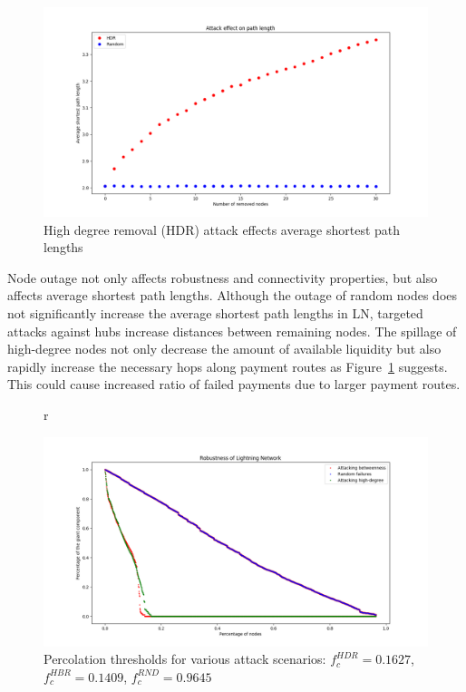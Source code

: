 \documentclass[a4paper]{article}
\theoremstyle{definition}
\begin{document}
\begin{figure}
	\captionsetup{justification=centering,margin=0.1cm}
	\caption{High degree removal (HDR) attack effects average shortest path lengths}\label{fig:attackeffectpath}
	\begin{center}
		\includegraphics[width=\linewidth]{attackEffectPathLength.png}	
	\end{center}
\end{figure}

Node outage not only affects robustness and connectivity properties, but also affects average shortest path lengths. Although the outage of random nodes does not significantly increase the average shortest path lengths in LN, targeted attacks against hubs increase distances between remaining nodes. The spillage of high-degree nodes not only decrease the amount of available liquidity but also rapidly increase the necessary hops along payment routes as Figure~\ref{fig:attackeffectpath} suggests. This could cause increased ratio of failed payments due to larger payment routes. 

\begin{figure}{r}
	\captionsetup{justification=centering,margin=0.5cm}
	\begin{center}
		\includegraphics[width=\linewidth]{randomHighBetweenness.png}	
	\end{center}	
	\caption{Percolation thresholds for various attack scenarios: $f_{c}^{HDR}=0.1627$, $f_{c}^{HBR}=0.1409$, $f_{c}^{RND}=0.9645$}\label{fig:randhighbetween}
	\vspace{-10pt}
\end{figure} 
\end{document}
